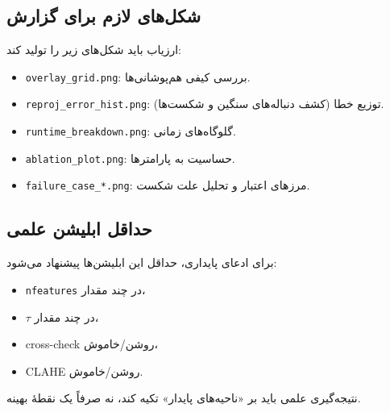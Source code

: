 \subsection{شکل‌های لازم برای گزارش}
ارزیاب باید شکل‌های زیر را تولید کند:
\begin{itemize}
  \item \texttt{overlay\_grid.png}: بررسی کیفی هم‌پوشانی‌ها.
  \item \texttt{reproj\_error\_hist.png}: توزیع خطا (کشف دنباله‌های سنگین و شکست‌ها).
  \item \texttt{runtime\_breakdown.png}: گلوگاه‌های زمانی.
  \item \texttt{ablation\_plot.png}: حساسیت به پارامترها.
  \item \texttt{failure\_case\_*.png}: مرزهای اعتبار و تحلیل علت شکست.
\end{itemize}

\subsection{حداقل ابلیشن علمی}
برای ادعای پایداری، حداقل این ابلیشن‌ها پیشنهاد می‌شود:
\begin{itemize}
  \item \texttt{nfeatures} در چند مقدار،
  \item $\tau$ در چند مقدار،
  \item cross-check روشن/خاموش،
  \item CLAHE روشن/خاموش.
\end{itemize}
نتیجه‌گیری علمی باید بر «ناحیه‌های پایدار» تکیه کند، نه صرفاً یک نقطهٔ بهینه.
